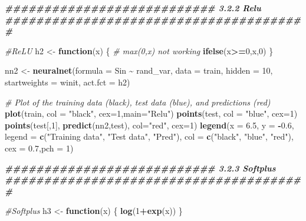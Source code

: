 \documentclass[
]{article}
\newenvironment{Shaded}{\begin{snugshade}}{\end{snugshade}}
\newcommand{\AttributeTok}[1]{\textcolor[rgb]{0.13,0.29,0.53}{#1}}
\newcommand{\CommentTok}[1]{\textcolor[rgb]{0.56,0.35,0.01}{\textit{#1}}}
\newcommand{\ControlFlowTok}[1]{\textcolor[rgb]{0.13,0.29,0.53}{\textbf{#1}}}
\newcommand{\DecValTok}[1]{\textcolor[rgb]{0.00,0.00,0.81}{#1}}
\newcommand{\DocumentationTok}[1]{\textcolor[rgb]{0.56,0.35,0.01}{\textbf{\textit{#1}}}}
\newcommand{\FloatTok}[1]{\textcolor[rgb]{0.00,0.00,0.81}{#1}}
\newcommand{\FunctionTok}[1]{\textcolor[rgb]{0.13,0.29,0.53}{\textbf{#1}}}
\newcommand{\NormalTok}[1]{#1}
\newcommand{\OtherTok}[1]{\textcolor[rgb]{0.56,0.35,0.01}{#1}}
\newcommand{\SpecialCharTok}[1]{\textcolor[rgb]{0.81,0.36,0.00}{\textbf{#1}}}
\newcommand{\StringTok}[1]{\textcolor[rgb]{0.31,0.60,0.02}{#1}}
\begin{document}
\begin{Shaded}
\begin{Highlighting}[]
\DocumentationTok{\#\#\#\#\#\#\#\#\#\#\#\#\#\#\#\#\#\#\#\#\#\#\#\#\#\#\#  3.2.2 Relu \#\#\#\#\#\#\#\#\#\#\#\#\#\#\#\#\#\#\#\#\#\#\#\#\#\#\#\#\#\#\#\#\#\#\#\#\#\#\#}

\CommentTok{\#ReLU}
\NormalTok{h2 }\OtherTok{\textless{}{-}} \ControlFlowTok{function}\NormalTok{(x) \{}
  \CommentTok{\# max(0,x) not working}
  \FunctionTok{ifelse}\NormalTok{(x}\SpecialCharTok{\textgreater{}=}\DecValTok{0}\NormalTok{,x,}\DecValTok{0}\NormalTok{)}
\NormalTok{\}}


\NormalTok{nn2 }\OtherTok{\textless{}{-}} \FunctionTok{neuralnet}\NormalTok{(}\AttributeTok{formula =}\NormalTok{ Sin }\SpecialCharTok{\textasciitilde{}}\NormalTok{ rand\_var, }\AttributeTok{data =}\NormalTok{ train, }\AttributeTok{hidden =} \DecValTok{10}\NormalTok{,}
\AttributeTok{startweights =}\NormalTok{ winit, }\AttributeTok{act.fct =}\NormalTok{ h2)}

\CommentTok{\# Plot of the training data (black), test data (blue), and predictions (red)}
\FunctionTok{plot}\NormalTok{(train,  }\AttributeTok{col =} \StringTok{"black"}\NormalTok{, }\AttributeTok{cex=}\DecValTok{1}\NormalTok{,}\AttributeTok{main=}\StringTok{"Relu"}\NormalTok{)}
\FunctionTok{points}\NormalTok{(test, }\AttributeTok{col =} \StringTok{"blue"}\NormalTok{, }\AttributeTok{cex=}\DecValTok{1}\NormalTok{)}
\FunctionTok{points}\NormalTok{(test[,}\DecValTok{1}\NormalTok{], }\FunctionTok{predict}\NormalTok{(nn2,test), }\AttributeTok{col=}\StringTok{"red"}\NormalTok{, }\AttributeTok{cex=}\DecValTok{1}\NormalTok{)}
\FunctionTok{legend}\NormalTok{(}\AttributeTok{x =} \FloatTok{6.5}\NormalTok{, }\AttributeTok{y =} \SpecialCharTok{{-}}\FloatTok{0.6}\NormalTok{, }\AttributeTok{legend =} \FunctionTok{c}\NormalTok{(}\StringTok{"Training data"}\NormalTok{, }\StringTok{"Test data"}\NormalTok{,}
\StringTok{"Pred"}\NormalTok{), }\AttributeTok{col =} \FunctionTok{c}\NormalTok{(}\StringTok{"black"}\NormalTok{, }\StringTok{"blue"}\NormalTok{, }\StringTok{"red"}\NormalTok{), }\AttributeTok{cex =} \FloatTok{0.7}\NormalTok{,}\AttributeTok{pch =} \DecValTok{1}\NormalTok{)}

\DocumentationTok{\#\#\#\#\#\#\#\#\#\#\#\#\#\#\#\#\#\#\#\#\#\#\#\#\#\#\#  3.2.3 Softplus \#\#\#\#\#\#\#\#\#\#\#\#\#\#\#\#\#\#\#\#\#\#\#\#\#\#\#\#\#\#\#\#\#\#\#\#\#\#\#}

\CommentTok{\#Softplus}
\NormalTok{h3 }\OtherTok{\textless{}{-}} \ControlFlowTok{function}\NormalTok{(x) \{}
  \FunctionTok{log}\NormalTok{(}\DecValTok{1}\SpecialCharTok{+}\FunctionTok{exp}\NormalTok{(x))}
\NormalTok{\}}


\end{Highlighting}
\end{Shaded}
\end{document}
